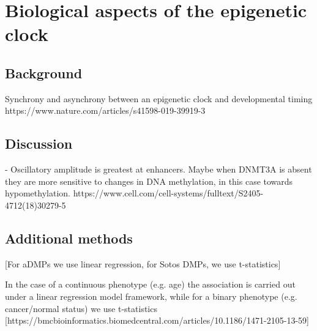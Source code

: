 
\chapter{Biological aspects of the epigenetic clock}  

\ifpdf
    \graphicspath{{Chapter3/Figs/Raster/}{Chapter3/Figs/PDF/}{Chapter3/Figs/}}
\else
    \graphicspath{{Chapter3/Figs/Vector/}{Chapter3/Figs/}}
\fi


\section{Background} 

Synchrony and asynchrony between an epigenetic clock and developmental timing
https://www.nature.com/articles/s41598-019-39919-3

\section{Discussion}

- Oscillatory amplitude is greatest at enhancers.  Maybe when DNMT3A is absent they are more sensitive to changes in DNA methylation, in this case towards hypomethylation. 
https://www.cell.com/cell-systems/fulltext/S2405-4712(18)30279-5



\section{Additional methods}

[For aDMPs we use linear regression, for Sotos DMPs, we use t-statistics]

In the case of a continuous phenotype (e.g. age) the association is carried out under a linear regression model framework, while for a binary phenotype (e.g. cancer/normal status) we use t-statistics [https://bmcbioinformatics.biomedcentral.com/articles/10.1186/1471-2105-13-59]

